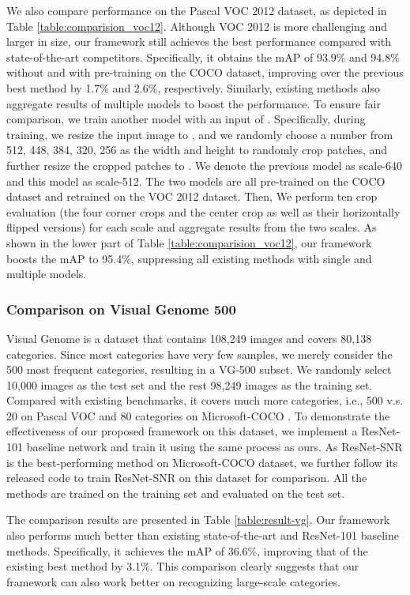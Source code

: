 \documentclass[10pt,twocolumn,letterpaper]{article}
\begin{document}
We also compare performance on the Pascal VOC 2012 dataset, as depicted in Table \ref{table:comparision_voc12}. Although VOC 2012 is more challenging and larger in size, our framework still achieves the best performance compared with state-of-the-art competitors. Specifically, it obtains the mAP of 93.9\% and 94.8\% without and with pre-training on the COCO dataset, improving over the previous best method by 1.7\% and 2.6\%, respectively. Similarly, existing methods also aggregate results of multiple models to boost the performance. To ensure fair comparison, we train another model with an input of . Specifically, during training, we resize the input image to , and we randomly choose a number from {512, 448, 384, 320, 256} as the width and height to randomly crop patches, and further resize the cropped patches to . We denote the previous model as scale-640 and this model as scale-512. The two models are all pre-trained on the COCO dataset and retrained on the VOC 2012 dataset. Then, We perform ten crop evaluation (the four corner crops and the center crop as well as their horizontally flipped versions) for each scale and aggregate results from the two scales. As shown in the lower part of Table \ref{table:comparision_voc12}, our framework boosts the mAP to 95.4\%, suppressing all existing methods with single and multiple models.

\subsubsection{Comparison on Visual Genome 500}
Visual Genome \cite{krishna2017visual} is a dataset that contains 108,249 images and covers 80,138 categories. Since most categories have very few samples, we merely consider the 500 most frequent categories, resulting in a VG-500 subset. We randomly select 10,000 images as the test set and the rest 98,249 images as the training set. Compared with existing benchmarks, it covers much more categories, i.e., 500 v.s. 20 on Pascal VOC \cite{everingham2010pascal} and 80 categories on Microsoft-COCO \cite{lin2014microsoft}. To demonstrate the effectiveness of our proposed framework on this dataset, we implement a ResNet-101 baseline network and train it using the same process as ours. As ResNet-SNR \cite{zhu2017learning} is the best-performing method on Microsoft-COCO dataset, we further follow its released code to train ResNet-SNR on this dataset for comparison. All the methods are trained on the training set and evaluated on the test set.

The comparison results are presented in Table \ref{table:result-vg}. Our framework also performs much better than existing state-of-the-art and ResNet-101 baseline methods. Specifically, it achieves the mAP of 36.6\%, improving that of the existing best method by 3.1\%. This comparison clearly suggests that our framework can also work better on recognizing large-scale categories.
\end{document}
